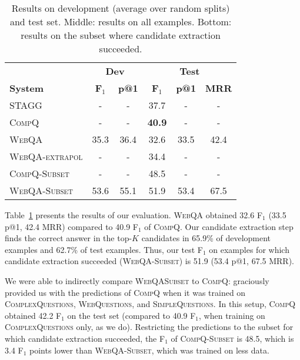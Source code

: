 \documentclass[11pt,a4paper]{article}
\begin{document}
\begin{table}[t]
\begin{center}
\scriptsize{
\begin{tabular}{l|c|c|c|c|c|}
 \toprule
 & \multicolumn{2}{c|}{\textbf{Dev}} & \multicolumn{3}{c|}{\textbf{Test}}\\ 
 \textbf{System} & \textbf{F$_1$} & \textbf{p@1} & \textbf{F$_1$} & \textbf{p@1} & \textbf{MRR} \\ 
 \midrule
\textsc{STAGG} & - & -  & 37.7 & - & -   \\ 
\textsc{CompQ} & - & - & \textbf{40.9} & - & -  \\ 
\midrule
\textsc{WebQA} & 35.3 & 36.4 & 32.6  & 33.5 & 42.4    \\
\textsc{WebQA-extrapol} & - & - & 34.4 & - & -   \\
\midrule
\textsc{CompQ-Subset} & - & - & 48.5 & - & -   \\
\textsc{WebQA-Subset}  & 53.6 & 55.1 & 51.9 & 53.4 & 67.5  \\
\toprule
\end{tabular}}
\end{center}
\caption{Results on development (average over random splits) and test set. Middle: results on all examples. Bottom: results on the subset where candidate extraction succeeded.}
\label{tab:results}
\end{table}

Table~\ref{tab:results} presents the results of our evaluation. \textsc{WebQA} obtained 32.6 F$_1$ (33.5 p@1, 42.4 MRR) compared to 40.9 F$_1$ of \textsc{CompQ}. Our candidate extraction step finds the correct answer in the top-$K$ candidates in 65.9\% of development examples and 62.7\% of test examples. Thus, our test F$_1$ on examples for which candidate extraction succeeded (\textsc{WebQA-Subset}) is 51.9 (53.4 p@1, 67.5 MRR).

We were able to indirectly compare \textsc{WebQASubset} to \textsc{CompQ}: 
 graciously provided us with the predictions of \textsc{CompQ} when it was trained on \textsc{ComplexQuestions}, \textsc{WebQuestions}, and \textsc{SimpleQuestions}. In this setup, \textsc{CompQ} obtained 42.2 F$_1$ on the test set (compared to 40.9 F$_1$, when training on \textsc{ComplexQuestions} only, as we do). Restricting the predictions to the subset for which candidate extraction succeeded, the F$_1$ of \textsc{CompQ-Subset} is 48.5, which is 3.4 F$_1$ points lower than \textsc{WebQA-Subset}, which was trained on less data.
\end{document}
